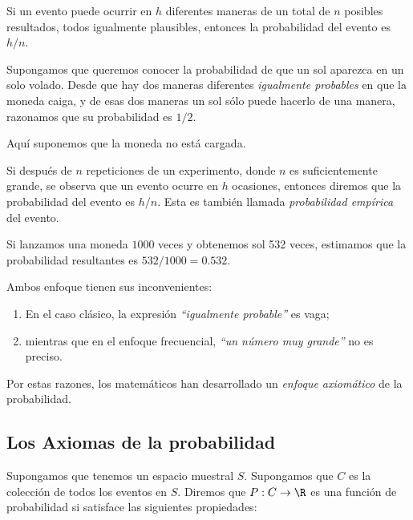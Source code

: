 Si un evento puede ocurrir en $h$ diferentes maneras de un total de $n$ posibles resultados, todos igualmente plausibles, entonces la probabilidad del evento es $h/n.$


\begin{ejemplo}
	\label{exmp:1.10}
	Supongamos que queremos conocer la probabilidad de que un sol aparezca en un solo volado.  Desde que hay dos maneras diferentes \emph{igualmente probables} en que la moneda caiga,  y de esas dos maneras un sol sólo puede hacerlo de una manera, razonamos que su probabilidad es $1/2.$
	
	
	\begin{rem}
		Aquí suponemos que la moneda no está cargada.
	\end{rem}
	
\end{ejemplo}


Si después de $n$ repeticiones de un experimento, donde $n$ es suficientemente grande, se observa que un evento ocurre en $h$ ocasiones, entonces diremos que la probabilidad del evento es $h/n.$  Esta es también llamada \emph{probabilidad empírica} del evento.


\begin{ejemplo}
	\label{exmp:1.11}
	Si lanzamos una moneda $1000$ veces y obtenemos sol 532 veces, estimamos que la probabilidad resultantes es $532/1000=0.532$.
\end{ejemplo}



\begin{rem}
	Ambos enfoque tienen sus inconvenientes:
	\begin{enumerate}
		\item En el caso clásico, la expresión \emph{``igualmente probable''} es vaga; 
		\item mientras que en el enfoque frecuencial, \emph{``un número muy grande''} no es preciso. 
	\end{enumerate}
	Por estas razones, los matemáticos han desarrollado un \emph{enfoque axiomático} de la probabilidad.
\end{rem}


\subsection{Los Axiomas de la probabilidad}

Supongamos que tenemos un espacio muestral $S.$ Supongamos que $C$ es la colección de todos los eventos en $S.$ Diremos que $P:C \to \R$ es una función de probabilidad si satisface las siguientes propiedades:

